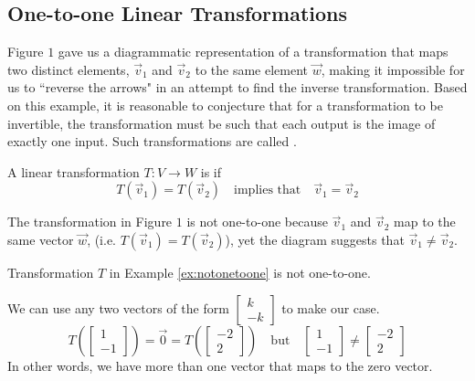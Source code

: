 \documentclass{ximera}
\begin{document}

\subsection*{One-to-one Linear Transformations}
Figure $1$ gave us a diagrammatic representation of a transformation that maps two distinct elements, $\vec{v}_1$ and $\vec{v}_2$ to the same element $\vec{w}$, making it impossible for us to ``reverse the arrows" in an attempt to find the inverse transformation.  Based on this example, it is reasonable to conjecture that for a transformation to be invertible, the transformation must be such that each output is the image of exactly one input.  Such transformations are called .  
\begin{definition}\label{def:onetoone} A linear transformation $T:V\rightarrow W$ is  if 
$$T(\vec{v}_1)=T(\vec{v}_2)\quad \text{implies that}\quad \vec{v}_1=\vec{v}_2$$
\end{definition}
The transformation in Figure $1$ is not one-to-one because $\vec{v}_1$ and $\vec{v}_2$ map to the same vector $\vec{w}$, (i.e. $T(\vec{v}_1)=T(\vec{v}_2)$), yet the diagram suggests that $\vec{v}_1\neq\vec{v}_2$.

\begin{example}\label{ex:notonetoone2}
Transformation $T$ in Example \ref{ex:notonetoone} is not one-to-one.
\begin{explanation}
We can use any two vectors of the form $\begin{bmatrix}k\\-k\end{bmatrix}$ to make our case.  
$$T\left(\begin{bmatrix}1\\-1\end{bmatrix}\right)=\vec{0}=T\left(\begin{bmatrix}-2\\2\end{bmatrix}\right)\quad \text{but}\quad\begin{bmatrix}1\\-1\end{bmatrix}\neq \begin{bmatrix}-2\\2\end{bmatrix}$$
In other words, we have more than one vector that maps to the zero vector.
\end{explanation}
\end{example}
\end{document}

